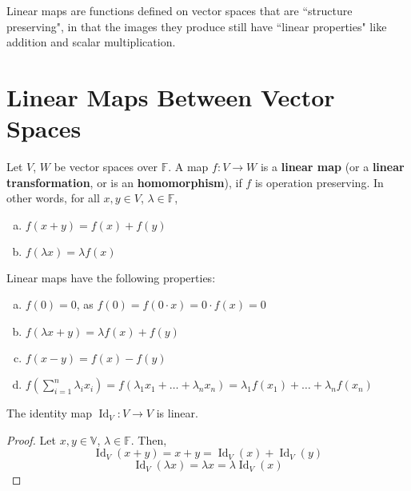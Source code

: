 \documentclass[letterpaper,12pt]{article}
\begin{document}
Linear maps are functions defined on vector spaces that are ``structure preserving", in that the images they produce still have ``linear properties" like addition and scalar multiplication.

\section*{Linear Maps Between Vector Spaces}
\begin{definition}
Let $V$, $W$ be vector spaces over $\mathbb{F}$. A map $f: V \rightarrow W$ is a \textbf{linear map} (or a \textbf{linear transformation}, or is an \textbf{homomorphism}), if $f$ is operation preserving. In other words, for all $x, y \in V$, $\lambda \in \mathbb{F}$,
\begin{enumerate}[(a)]
    \item $f(x + y) = f(x) + f(y)$
    \item $f(\lambda x) = \lambda f(x)$
\end{enumerate}
\end{definition}


\begin{theorem}
Linear maps have the following properties:
\begin{enumerate}[(a)]
    \item $f(0) = 0$, as $f(0) = f(0 \cdot x) = 0 \cdot f(x) = 0$
    \item $f(\lambda x + y) = \lambda f(x) + f(y)$
    \item $f(x - y) = f(x) - f(y)$
    \item $f\left(\sum_{i=1}^n \lambda_i x_i \right) = f(\lambda_1 x_1 + \dots + \lambda_n x_n) = \lambda_1 f(x_1) + \dots + \lambda_n f(x_n)$
\end{enumerate}
\end{theorem}

\begin{example}
The identity map $\operatorname{Id}_{V}: V \rightarrow V$ is linear.
\end{example}
\begin{proof}
Let $x, y \in \mathbb{V}$, $\lambda \in \mathbb{F}$. Then,
\begin{equation*}
    \operatorname{Id}_{V}(x + y) = x + y = \operatorname{Id}_{V}(x) + \operatorname{Id}_{V}(y)
\end{equation*}
\begin{equation*}
    \operatorname{Id}_{V}(\lambda x) = \lambda x = \lambda \operatorname{Id}_{V}(x)
\end{equation*}
\end{proof}
\end{document}
